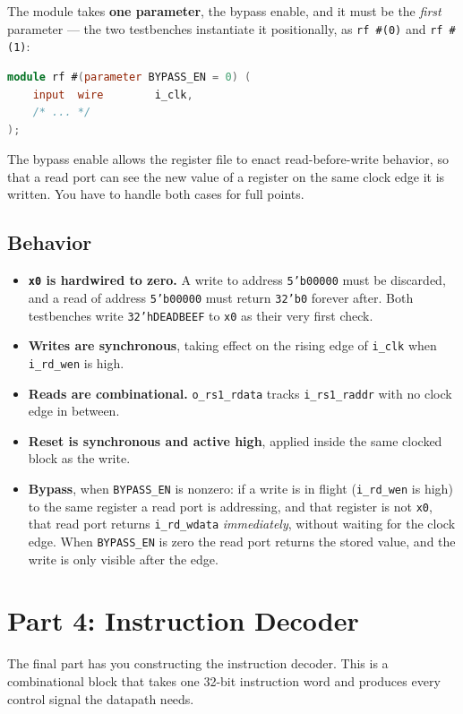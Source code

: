 \documentclass[11pt]{article}
\begin{document}
The module takes \textbf{one parameter}, the bypass enable, and it must be the
\emph{first} parameter --- the two testbenches instantiate it positionally, as
\texttt{rf \#(0)} and \texttt{rf \#(1)}:

\begin{lstlisting}[language=Verilog]
module rf #(parameter BYPASS_EN = 0) (
    input  wire        i_clk,
    /* ... */
);
\end{lstlisting}

The bypass enable allows the register file to enact read-before-write behavior, so that a read port can see the new value of a register on the same clock edge it is written. You have to handle both cases for full points.



\subsection{Behavior}
\begin{itemize}
  \item \textbf{\texttt{x0} is hardwired to zero.} A write to address
        \texttt{5'b00000} must be discarded, and a read of address
        \texttt{5'b00000} must return \texttt{32'b0} forever after. Both
        testbenches write \texttt{32'hDEADBEEF} to \texttt{x0} as their very
        first check.
  \item \textbf{Writes are synchronous}, taking effect on the rising edge of
        \texttt{i\_clk} when \texttt{i\_rd\_wen} is high.
  \item \textbf{Reads are combinational.} \texttt{o\_rs1\_rdata} tracks
        \texttt{i\_rs1\_raddr} with no clock edge in between.
  \item \textbf{Reset is synchronous and active high}, applied inside the same
        clocked block as the write.
  \item \textbf{Bypass}, when \texttt{BYPASS\_EN} is nonzero: if a write is in
        flight (\texttt{i\_rd\_wen} is high) to the same register a read port
        is addressing, and that register is not \texttt{x0}, that read port
        returns \texttt{i\_rd\_wdata} \emph{immediately}, without waiting for
        the clock edge. When \texttt{BYPASS\_EN} is zero the read port returns
        the stored value, and the write is only visible after the edge.
\end{itemize}

\newpage

\section{Part 4: Instruction Decoder}
\label{sec:decoder}
The final part has you constructing the instruction decoder. This is a
combinational block that takes one 32-bit instruction word and produces every control signal the datapath needs.
\end{document}

